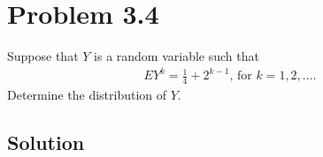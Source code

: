 \documentclass[10pt,a4paper]{article}
\theoremstyle{theorem}
\theoremstyle{definition}
\begin{document}
\section*{Problem 3.4}
Suppose that $Y$ is a random variable such that 
\begin{align*}
EY^k = \frac{1}{4} + 2^{k-1} \text{, for } k=1,2,....
\end{align*}
Determine the distribution of $Y$.

\subsection*{Solution}
\end{document}
